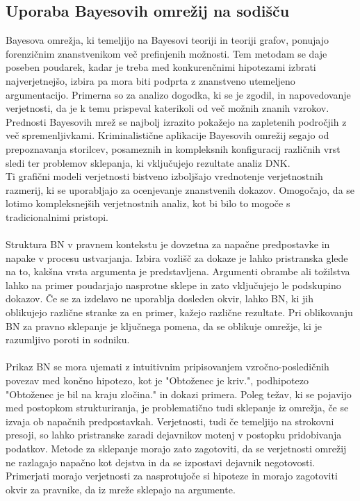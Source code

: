 \documentclass[12pt,a4paper]{amsart}
\theoremstyle{definition} %
\theoremstyle{plain} %
\begin{document}
\subsection{Uporaba Bayesovih omrežij na sodišču}
Bayesova omrežja, ki temeljijo na Bayesovi teoriji in teoriji grafov, ponujajo forenzičnim znanstvenikom več prefinjenih možnosti. Tem metodam
se daje poseben poudarek, kadar je treba med konkurenčnimi hipotezami izbrati najverjetnejšo, izbira pa mora biti podprta z znanstveno utemeljeno
argumentacijo. Primerna so za analizo dogodka, ki se je zgodil, in napovedovanje verjetnosti, da je k temu prispeval katerikoli od več možnih
znanih vzrokov. Prednosti Bayesovih mrež se najbolj izrazito pokažejo na zapletenih področjih z več spremenljivkami. Kriminalistične aplikacije
Bayesovih omrežij segajo od prepoznavanja storilcev, posameznih in kompleksnih konfiguracij različnih vrst sledi ter problemov sklepanja, ki
vključujejo rezultate analiz DNK.\\
Ti grafični modeli verjetnosti bistveno izboljšajo vrednotenje verjetnostnih razmerij, ki se uporabljajo za ocenjevanje znanstvenih dokazov.
Omogočajo, da se lotimo kompleksnejših verjetnostnih analiz, kot bi bilo to mogoče s tradicionalnimi pristopi. \\\\
Struktura BN v pravnem kontekstu je dovzetna za napačne predpostavke in napake v procesu ustvarjanja. Izbira vozlišč za dokaze je lahko
pristranska glede na to, kakšna vrsta argumenta je predstavljena. Argumenti obrambe ali tožilstva lahko na primer poudarjajo nasprotne sklepe
in zato vključujejo le podskupino dokazov. Če se za izdelavo ne uporablja dosleden okvir, lahko BN, ki jih oblikujejo različne stranke za en
primer, kažejo različne rezultate. Pri oblikovanju BN za pravno sklepanje je ključnega pomena, da se oblikuje omrežje, ki je razumljivo poroti
in sodniku.\\\\
Prikaz BN se mora ujemati z intuitivnim pripisovanjem vzročno-posledičnih povezav med končno hipotezo, kot je "Obtoženec je kriv.", podhipotezo
"Obtoženec je bil na kraju zločina." in dokazi primera. Poleg težav, ki se pojavijo med postopkom strukturiranja, je problematično tudi sklepanje
iz omrežja, če se izvaja ob napačnih predpostavkah. Verjetnosti, tudi če temeljijo na strokovni presoji, so lahko pristranske zaradi dejavnikov
motenj v postopku pridobivanja podatkov. Metode za sklepanje morajo zato zagotoviti, da se verjetnosti omrežij ne razlagajo napačno kot dejstva in
da se izpostavi dejavnik negotovosti. Primerjati morajo verjetnosti za nasprotujoče si hipoteze in morajo zagotoviti okvir za pravnike, da iz
mreže sklepajo na argumente.\\\\
\end{document}
